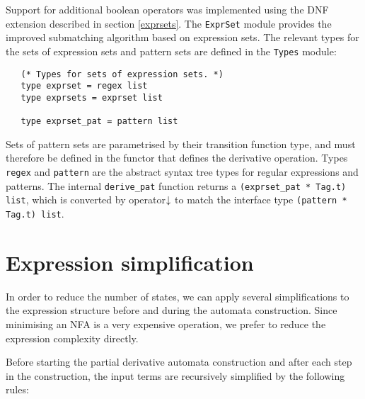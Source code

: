 Support for additional boolean operators was implemented using the DNF extension
described in section \ref{exprsets}.  The \texttt{ExprSet} module provides the
improved submatching algorithm based on expression sets.  The relevant types
for the sets of expression sets and pattern sets are defined in the
\texttt{Types} module:

\begin{lstlisting}
   (* Types for sets of expression sets. *)
   type exprset = regex list
   type exprsets = exprset list

   type exprset_pat = pattern list
\end{lstlisting}

Sets of pattern sets are parametrised by their transition function type, and
must therefore be defined in the functor that defines the derivative operation.
Types \texttt{regex} and \texttt{pattern} are the abstract syntax tree types for
regular expressions and patterns. The internal \texttt{derive\_pat} function
returns a \texttt{(exprset\_pat * Tag.t) list}, which is converted by operator
$\!\!\downarrow$ to match the interface type \texttt{(pattern * Tag.t) list}.




\section{Expression simplification}

In order to reduce the number of states, we can apply several simplifications to
the expression structure before and during the automata construction. Since
minimising an NFA is a very expensive operation, we prefer to reduce the
expression complexity directly.

Before starting the partial derivative automata construction and after each step
in the construction, the input terms are recursively simplified by the following
rules:

